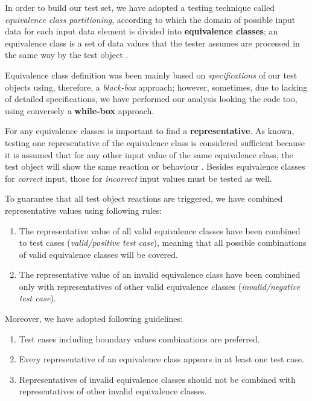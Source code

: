 \documentclass[sigconf]{acmart}
\begin{document}
In order to build our test set, we have adopted a testing technique called \textit{equivalence class partitioning}, according to which the domain of possible input data for each input data element is divided
into \textbf{equivalence classes}; an equivalence class is a set of data values that the tester assumes are processed in the same way by the test object \cite{FoundationSoftwareTesting}. 

Equivalence class definition was been mainly based on \textit{specifications} of our test objects using, therefore, a \textit{black-box} approach; however, sometimes, due to lacking of detailed specifications, we have performed our analysis looking the code too, using conversely a \textbf{while-box} approach. 

For any equivalence classes is important to find a \textbf{representative}. As known, testing one representative of the equivalence class is considered sufficient because it is assumed that for any other input value of the same equivalence class, the test object will show the same reaction or behaviour \cite{FoundationSoftwareTesting}. Besides equivalence classes for \textit{correct} input, those for \textit{incorrect} input values must be tested as well.

To guarantee that all test object reactions are triggered, we have combined representative values using following rules:
\begin{enumerate}
\item The representative value of all valid equivalence classes have been combined to test cases (\textit{valid/positive test case}), meaning that all possible combinations of valid equivalence classes will be covered. 
\item The representative value of an invalid equivalence class have been combined only with representatives of other valid equivalence classes (\textit{invalid/negative test case}).
\end{enumerate}

Moreover, we have adopted following guidelines\cite{FoundationSoftwareTesting}:

\begin{enumerate}
\item Test cases including boundary values combinations are preferred.
\item Every representative of an equivalence class appears in at least one test case.
\item Representatives of invalid equivalence classes should not be combined with representatives of other invalid equivalence classes.
\end{enumerate}
\end{document}
